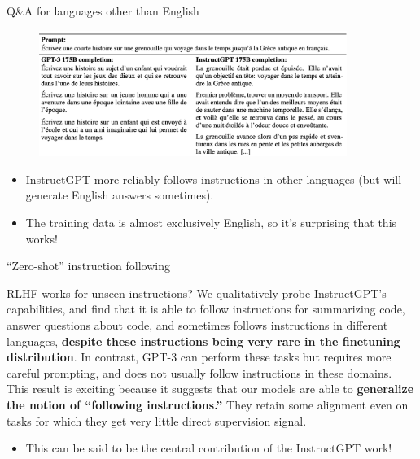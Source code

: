 \begin{vbframe}{Q\&A for languages other than English}

\vfill

\begin{figure}
\centering
\includegraphics[width = 10cm]{figure/nonenglish.png}
\end{figure}

\begin{itemize}
	\item InstructGPT more reliably follows instructions
	in other languages (but will generate English
	answers sometimes).
        \item The training data is almost exclusively
	English, so it's surprising that this works!
\end{itemize}

\vfill

\end{vbframe}

\begin{vbframe}{``Zero-shot'' instruction following}



\begin{block}{RLHF works for unseen instructions?}
We qualitatively probe InstructGPT’s capabilities, and find
that it is able to follow instructions for summarizing code,
answer questions about code, and sometimes follows
instructions in different languages, \textbf{despite these
instructions being very rare in the finetuning
distribution}. In contrast, GPT-3 can perform these tasks but
requires more careful prompting, and does not usually follow
instructions in these domains. This result is exciting
because it suggests that our models are able to \textbf{generalize
the notion of “following instructions.”} They retain some
alignment even on tasks for which they get very little
direct supervision signal.
\end{block}


\begin{itemize}
	\item This can be said to be the central contribution
	of the InstructGPT work!
\end{itemize}

\vfill


\end{vbframe}




